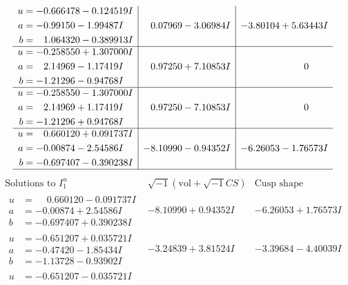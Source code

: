 \documentclass[1p]{elsarticle_modified}
\theoremstyle{definition}
\newcommand{\I}{\sqrt{-1}}
\begin{document}
$$\begin{array}{c|c|c}
\begin{aligned}
u &= -0.666478 - 0.124519 I \\
a &= -0.99150 - 1.99487 I \\
b &= \phantom{-}1.064320 - 0.389913 I\end{aligned}
 & \phantom{-}0.07969 - 3.06984 I & -3.80104 + 5.63443 I \\ \hline\begin{aligned}
u &= -0.258550 + 1.307000 I \\
a &= \phantom{-}2.14969 - 1.17419 I \\
b &= -1.21296 - 0.94768 I\end{aligned}
 & \phantom{-}0.97250 + 7.10853 I & \phantom{-0.000000 } 0 \\ \hline\begin{aligned}
u &= -0.258550 - 1.307000 I \\
a &= \phantom{-}2.14969 + 1.17419 I \\
b &= -1.21296 + 0.94768 I\end{aligned}
 & \phantom{-}0.97250 - 7.10853 I & \phantom{-0.000000 } 0 \\ \hline\begin{aligned}
u &= \phantom{-}0.660120 + 0.091737 I \\
a &= -0.00874 - 2.54586 I \\
b &= -0.697407 - 0.390238 I\end{aligned}
 & -8.10990 - 0.94352 I & -6.26053 - 1.76573 I\\
 \hline 
 \end{array}$$\newpage$$\begin{array}{c|c|c}  
\text{Solutions to }I^u_{1}& \I (\text{vol} + \sqrt{-1}CS) & \text{Cusp shape}\\
 \hline 
\begin{aligned}
u &= \phantom{-}0.660120 - 0.091737 I \\
a &= -0.00874 + 2.54586 I \\
b &= -0.697407 + 0.390238 I\end{aligned}
 & -8.10990 + 0.94352 I & -6.26053 + 1.76573 I \\ \hline\begin{aligned}
u &= -0.651207 + 0.035721 I \\
a &= -0.47420 - 1.85434 I \\
b &= -1.13728 - 0.93902 I\end{aligned}
 & -3.24839 + 3.81524 I & -3.39684 - 4.40039 I \\ \hline\begin{aligned}
u &= -0.651207 - 0.035721 I \\

\end{aligned}
\end{array}$$
\end{document}
